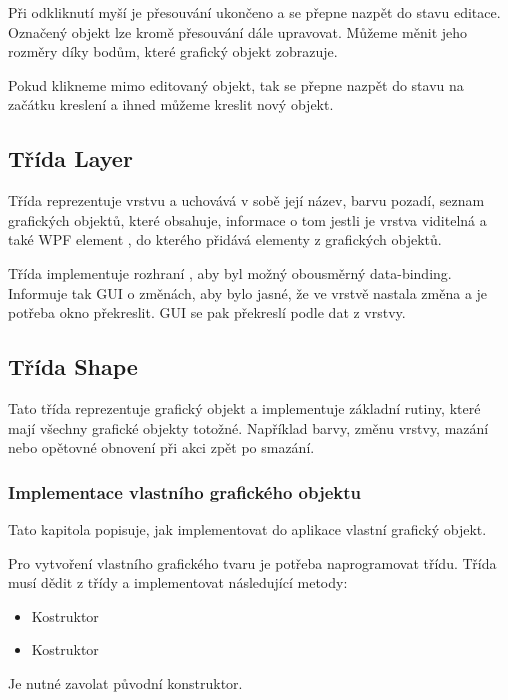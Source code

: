 \documentclass[
  field=inf,
  biblatex=false,
  glossaries,
  index
]{kidiplom}
\begin{document}
Při odkliknutí myší je přesouvání ukončeno a  se přepne nazpět do stavu editace. Označený objekt lze kromě přesouvání dále upravovat. Můžeme měnit jeho rozměry díky bodům, které grafický objekt zobrazuje.

Pokud klikneme mimo editovaný objekt, tak se  přepne nazpět do stavu na začátku kreslení a ihned můžeme kreslit nový objekt.

\subsection{Třída Layer}

Třída  reprezentuje vrstvu a uchovává v sobě její název, barvu pozadí, seznam grafických objektů, které obsahuje, informace o tom jestli je vrstva viditelná a také WPF element , do kterého přidává elementy z grafických objektů. 

Třída implementuje rozhraní , aby byl možný obousměrný data-binding. Informuje tak GUI o změnách, aby bylo jasné, že ve vrstvě nastala změna a je potřeba okno překreslit. GUI se pak překreslí podle dat z vrstvy.

\subsection{Třída Shape}

Tato třída reprezentuje grafický objekt a implementuje základní rutiny, které mají všechny grafické objekty totožné. Například barvy, změnu vrstvy, mazání nebo opětovné obnovení při akci zpět po smazání.

\subsubsection{Implementace vlastního grafického objektu}

Tato kapitola popisuje, jak implementovat do aplikace vlastní grafický objekt.

Pro vytvoření vlastního grafického tvaru je potřeba naprogramovat třídu. Třída musí dědit z třídy  a implementovat následující metody:

\begin{itemize}
\item Kostruktor 
\item Kostruktor 
\end{itemize}
Je nutné zavolat původní konstruktor.
\end{document}
